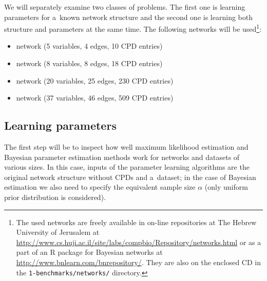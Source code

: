 \documentclass[english,cover]{fitthesis} %
\newcommand{\srccode}[1]{{\tt #1}}         %
\begin{document}
We will separately examine two classes of problems. The first one is learning parameters for a~known network structure and the second one is learning both structure and parameters at the same time. The following networks will be used\footnote{The used networks are freely available in on-line repositories at The Hebrew University of Jerusalem at \url{http://www.cs.huji.ac.il/site/labs/compbio/Repository/networks.html} or as a part of an R package for Bayesian networks at \url{http://www.bnlearn.com/bnrepository/}. They are also on the enclosed CD in the \srccode{1-benchmarks/networks/} directory.}:
\begin{itemize}
	\item {} network (5 variables, 4 edges, 10 CPD entries)
	\item {} network (8 variables, 8 edges, 18 CPD entries)
	\item {} network (20 variables, 25 edges, 230 CPD entries)
	\item {} network (37 variables, 46 edges, 509 CPD entries)
\end{itemize}


\subsection{Learning parameters}
The first step will be to inspect how well maximum likelihood estimation and Bayesian parameter estimation methods work for networks and datasets of various sizes. In this case, inputs of the parameter learning algorithms are the original network structure without CPDs and a~dataset; in the case of Bayesian estimation we also need to specify the equivalent sample size $\alpha$ (only uniform prior distribution is considered).
\end{document}
